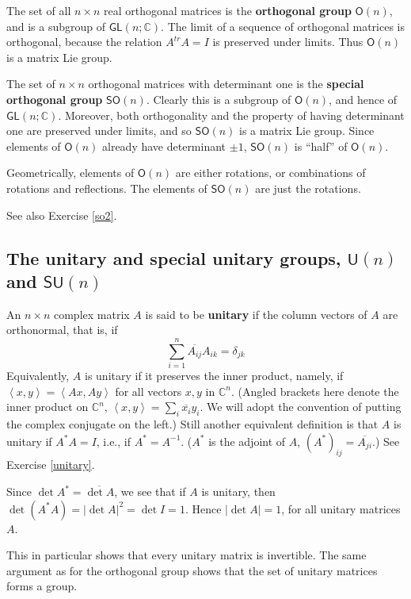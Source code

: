 \documentclass{amsbook}
\theoremstyle{plain}
\numberwithin{equation}{chapter}
\numberwithin{theorem}{chapter}
\begin{document}
The set of all $n\times n$ real orthogonal matrices is the \textbf{orthogonal
group} $\mathsf{O}(n)$, and is a subgroup of $\mathsf{GL}(n;\mathbb{C})$. The
limit of a sequence of orthogonal matrices is orthogonal, because the relation
$A^{tr}A=I$ is preserved under limits. Thus $\mathsf{O}(n)$ is a matrix Lie group.

The set of $n\times n$ orthogonal matrices with determinant one is the
\textbf{special orthogonal group} $\mathsf{SO}(n)$. Clearly this is a subgroup
of $\mathsf{O}(n)$, and hence of $\mathsf{GL}(n;\mathbb{C})$. Moreover, both
orthogonality and the property of having determinant one are preserved under
limits, and so $\mathsf{SO}(n)$ is a matrix Lie group. Since elements of
$\mathsf{O}(n)$ already have determinant $\pm1$, $\mathsf{SO}(n) $ is ``half''
of $\mathsf{O}(n)$.

Geometrically, elements of $\mathsf{O}(n)$ are either rotations, or
combinations of rotations and reflections. The elements of $\mathsf{SO}(n)$
are just the rotations.

See also Exercise \ref{so2}.

\subsection{The unitary and special unitary groups, $\mathsf{U}(n)$ and
$\mathsf{SU}(n)$}

An $n\times n$ complex matrix $A$ is said to be \textbf{unitary} if the column
vectors of $A$ are orthonormal, that is, if
\[
\sum_{i=1}^{n}\overline{A_{ij}}A_{ik}=\delta_{jk}%
\]
Equivalently, $A$ is unitary if it preserves the inner product, namely, if
$\left\langle x,y\right\rangle =\left\langle Ax,Ay\right\rangle $ for all
vectors $x,y$ in $\mathbb{C}^{n}$. (Angled brackets here denote the inner
product on $\mathbb{C}^{n}$, $\left\langle x,y\right\rangle =\sum_{i}%
\overline{x_{i}}y_{i}$. We will adopt the convention of putting the complex
conjugate on the left.) Still another equivalent definition is that $A$ is
unitary if $A^{*}A=I$, i.e., if $A^{*}=A^{-1}$. ($A^{*}$ is the adjoint of
$A$, $\left(  A^{*}\right)  _{ij}=\overline{A_{ji}}$.) See Exercise
\ref{unitary}.

Since $\det A^{*}=\overline{\det A}$, we see that if $A$ is unitary, then
$\det\left(  A^{*}A\right)  =\left|  \det A\right|  ^{2}=\det I=1$. Hence
$\left|  \det A\right|  =1$, for all unitary matrices $A$.

This in particular shows that every unitary matrix is invertible. The same
argument as for the orthogonal group shows that the set of unitary matrices
forms a group.
\end{document}
